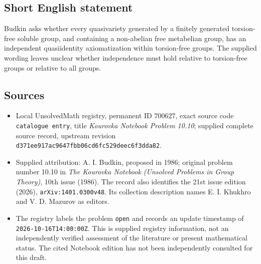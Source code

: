 \documentclass[11pt]{article}
\begin{document}
\subsection{Short English statement}
Budkin asks whether every quasivariety generated by a finitely generated torsion-free soluble group, and containing a non-abelian free metabelian group, has an independent quasiidentity axiomatization within torsion-free groups. The supplied wording leaves unclear whether independence must hold relative to torsion-free groups or relative to all groups.
\subsection{Sources}
\begin{itemize}
\item Local UnsolvedMath registry, permanent ID \(700627\), exact source code \texttt{catalogue entry}, title \emph{Kourovka Notebook Problem 10.10}; supplied complete source record, upstream revision \texttt{d371ee917ac9647fbb06cd6fc529deec6f3dda82}.
\item Supplied attribution: A. I. Budkin, proposed in 1986; original problem number 10.10 in \emph{The Kourovka Notebook (Unsolved Problems in Group Theory)}, 10th issue (1986). The record also identifies the 21st issue edition (2026), \texttt{arXiv:1401.0300v48}. Its collection description names E. I. Khukhro and V. D. Mazurov as editors.
\item The registry labels the problem \texttt{open} and records an update timestamp of \texttt{2026-10-16T14:00:00Z}. This is supplied registry information, not an independently verified assessment of the literature or present mathematical status. The cited Notebook edition has not been independently consulted for this draft.
\end{itemize}
\end{document}
